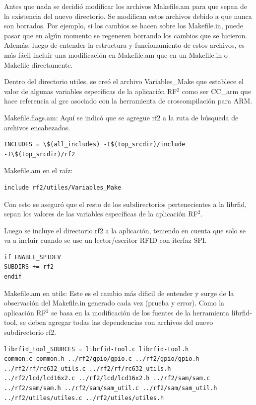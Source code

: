 \bigskip
Antes que nada se decidió modificar los archivos Makefile.am para que sepan de la existencia del nuevo directorio. Se modifican estos archivos debido a que nunca son borrados. Por ejemplo, si los cambios se hacen sobre los Makefile.in, puede pasar que en algún momento se regeneren borrando los cambios que se hicieron. Además, luego de entender la estructura y funcionamiento de estos archivos, es más fácil incluir una modificación en Makefile.am que en un Makefile.in o Makefile directamente.

Dentro del directorio utiles, se creó el archivo Variables\_Make que establece el valor de algunas variables específicas de la aplicación RF$^{2}$ como ser CC\_arm que hace referencia al gcc asociado con la herramienta de croscompilación para ARM. 

\bigskip
Makefile.flags.am:
Aquí se indicó que se agregue rf2 a la ruta de búsqueda de archivos encabezados.

\begin{verbatim}
INCLUDES = \$(all_includes) -I$(top_srcdir)/include 
-I\$(top_srcdir)/rf2
\end{verbatim}

Makefile.am en el raíz:

\begin{verbatim}
include rf2/utiles/Variables_Make
\end{verbatim}
Con esto se aseguró que el resto de los subdirectorios pertenecientes a la librfid, sepan los valores de las variables específicas de la aplicación RF$^{2}$.

\bigskip
Luego se incluye el directorio rf2 a la aplicación, teniendo en cuenta que solo se va a incluir cuando se use un lector/escritor RFID con iterfaz SPI.
\begin{verbatim}
if ENABLE_SPIDEV 
SUBDIRS += rf2 
endif
\end{verbatim}

\bigskip
Makefile.am en utils:
Este es el cambio más dificil de entender y surge de la observación del Makefile.in generado cada vez (prueba y error). Como la aplicación RF$^{2}$ se basa en la modificación de los fuentes de la herramienta librfid-tool, se deben agregar todas las dependencias con archivos del nuevo subdirectorio rf2.

\begin{verbatim}
librfid_tool_SOURCES = librfid-tool.c librfid-tool.h 
common.c common.h ../rf2/gpio/gpio.c ../rf2/gpio/gpio.h 
../rf2/rf/rc632_utils.c ../rf2/rf/rc632_utils.h 
../rf2/lcd/lcd16x2.c ../rf2/lcd/lcd16x2.h ../rf2/sam/sam.c 
../rf2/sam/sam.h ../rf2/sam/sam_util.c ../rf2/sam/sam_util.h 
../rf2/utiles/utiles.c ../rf2/utiles/utiles.h
\end{verbatim}

